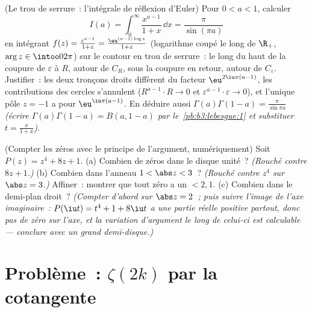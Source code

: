\begin{exercise}[$\star\star\star$]\label{exo:b3:residues:11}
(Le trou de serrure~: l'intégrale de réflexion d'Euler) Pour
$0 < a < 1$, calculer
\[
I(a) = \int_0^{\infty}\frac{x^{a-1}}{1 + x}\,\dd x =
\frac{\pi}{\sin(\pi a)}
\]
en intégrant $f(z) = \frac{z^{a-1}}{1+z} =
\frac{\eu^{(a-1)\log z}}{1 + z}$ (logarithme coupé le long
de $\R_+$, $\arg z \in \intoo0{2\pi}$) sur le contour en
trou de serrure~: le long du haut de la coupure de
$\varepsilon$ à $R$, autour de $C_R$, sous la coupure en
retour, autour de $C_\varepsilon$. Justifier~: les deux
tronçons droits diffèrent du facteur $\eu^{2\iu\pi(a-1)}$,
les contributions des cercles s'annulent ($R^{a-1}\cdot R
\to 0$ et $\varepsilon^{a-1}\cdot\varepsilon \to 0$), et
l'unique pôle $z = -1$ a pour  $\eu^{\iu\pi(a - 1)}$.
En déduire aussi $\Gamma(a)\Gamma(1 - a) =
\frac\pi{\sin\pi a}$ \emph{(écrire $\Gamma(a)\Gamma(1-a) =
B(a, 1-a)$ par le~\cref{pb:b3:lebesgue:1} et substituer $t =
\frac{x}{1+x}$)}.
\end{exercise}

\begin{exercise}[$\star\star$]\label{exo:b3:residues:12}
(Compter les zéros avec le principe de l'argument,
numériquement) Soit $P(z) = z^4 + 8z + 1$.
(a) Combien de zéros dans le disque unité~? \emph{(Rouché
contre $8z + 1$.)}
(b) Combien dans l'anneau $1 < \abs z < 3$~? \emph{(Rouché
contre $z^4$ sur $\abs z = 3$.)} Affiner~: montrer que tout
zéro a un  $< 2{,}1$.
(c) Combien dans le demi-plan droit~? \emph{(Compter d'abord
sur $\abs z = 2$~; puis suivre l'image de l'axe imaginaire~:
$P(\iu t) = t^4 + 1 + 8\iu t$ a une partie réelle positive
partout, donc pas de zéro sur l'axe, et la variation
d'argument le long de celui-ci est calculable --- conclure
avec un grand demi-disque.)}
\end{exercise}

\section{Problème~: \texorpdfstring{$\zeta(2k)$}{zeta(2k)} par
la cotangente}

